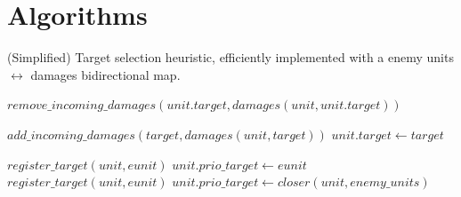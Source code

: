 %
%
%



\section{Algorithms}

\begin{algorithm}
\caption{(Simplified) Target selection heuristic, efficiently implemented with a enemy units $\leftrightarrow$ damages bidirectional map.}
\label{alg:targetselection}
\begin{algorithmic}
\State $remove\_incoming\_damages(unit.target, damages(unit,unit.target))$
\EndFunction

\State $add\_incoming\_damages(target, damages(unit, target))$
\State $unit.target \leftarrow target$
\EndFunction

            \State $register\_target(unit, eunit)$
            \State $unit.prio\_target \leftarrow eunit$
        \EndIf 
    \EndIf 
\EndFor
{}
            \State $register\_target(unit, eunit)$
        \EndIf 
    \EndFor
\EndIf
{} %
    $unit.prio\_target \leftarrow closer(unit, enemy\_units)$
\EndIf
\EndFunction
\end{algorithmic}
\end{algorithm}

